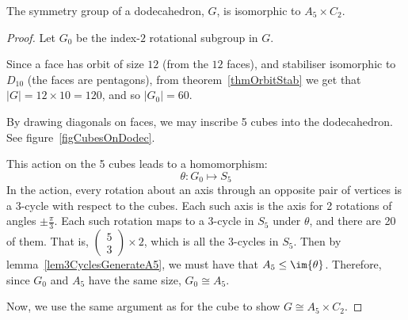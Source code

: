 \documentclass[../Main.tex]{subfiles}
\begin{document}
\begin{lemma}
    The symmetry group of a dodecahedron, $G$, is isomorphic to $A_5 \times C_2$.
\end{lemma}
\begin{proof}
    Let $G_0$ be the index-$2$ rotational subgroup in $G$.\par
    Since a face has orbit of size $12$ (from the $12$ faces), and stabiliser isomorphic to $D_{10}$ (the faces are pentagons), from theorem~\ref{thmOrbitStab} we get that $|G| = 12 \times 10 = 120$, and so $|G_0| = 60$.\par
    By drawing diagonals on faces, we may inscribe 5 cubes into the dodecahedron. See figure~\ref{figCubesOnDodec}.\par
    This action on the 5 cubes leads to a homomorphism:
    \begin{equation*}
        \theta : G_0 \mapsto S_5
    \end{equation*}
    In the action, every rotation about an axis through an opposite pair of vertices is a 3-cycle with respect to the cubes. Each such axis is the axis for 2 rotations of angles $\pm\frac{\pi}{3}$. Each such rotation maps to a 3-cycle in $S_5$ under $\theta$, and there are 20 of them. That is, $\begin{pmatrix}5 \\ 3\end{pmatrix} \times 2$, which is all the 3-cycles in $S_5$. Then by lemma~\ref{lem3CyclesGenerateA5}, we must have that $A_5 \leq \im{\theta}$. Therefore, since $G_0$ and $A_5$ have the same size, $G_0 \cong A_5$.\par
    Now, we use the same argument as for the cube to show $G \cong A_5 \times C_2$.
\end{proof}
\end{document}
